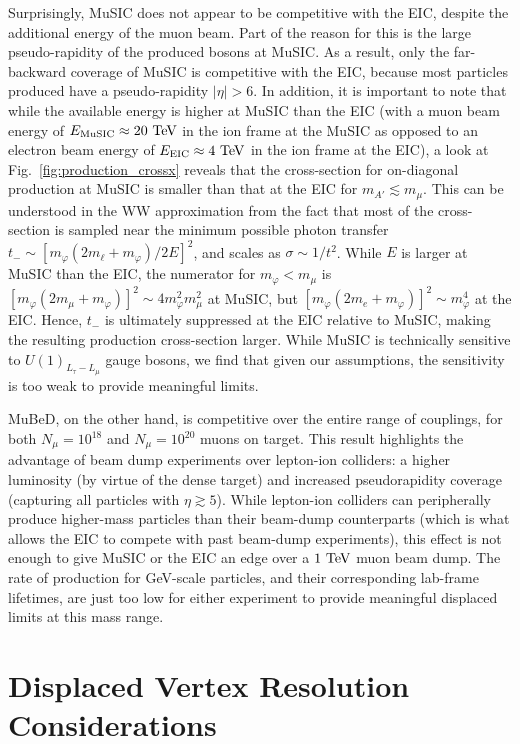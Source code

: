 Surprisingly, MuSIC does not appear to be competitive with the EIC, despite the additional energy of the muon beam. Part of the reason for this is the large pseudo-rapidity of the produced bosons at MuSIC. As a result, only the far-backward coverage of MuSIC is competitive with the EIC, because most particles produced have a pseudo-rapidity $|\eta| > 6$. In addition, it is important to note that while the available energy is higher at MuSIC than the EIC (with a muon beam energy of $E_{\rm MuSIC} \approx 20~{\rm TeV}$ in the ion frame at the MuSIC as opposed to an electron beam energy of $E_{\rm EIC} \approx 4~{\rm TeV}$ in the ion frame at the EIC), a look at Fig.~\ref{fig:production_crossx} reveals that the cross-section for on-diagonal production at MuSIC is smaller than that at the EIC for $m_{A'} \lesssim m_\mu$. This can be understood in the WW approximation from the fact that most of the cross-section is sampled near the minimum possible photon transfer $t_{-} \sim [m_\varphi (2m_\ell + m_\varphi)/2E]^2$, and scales as $\sigma \sim 1/t^2$. While $E$ is larger at MuSIC than the EIC, the numerator for $m_\varphi < m_\mu$ is $[m_\varphi (2m_\mu + m_\varphi)]^2 \sim 4m_\varphi^2 m_\mu^2$ at MuSIC, but $[m_\varphi(2m_e + m_\varphi)]^2 \sim m_\varphi^4$ at the EIC. Hence, $t_-$ is ultimately suppressed at the EIC relative to MuSIC, making the resulting production cross-section larger. While MuSIC is technically sensitive to $U(1)_{L_\tau - L_\mu}$ gauge bosons, we find that given our assumptions, the sensitivity is too weak to provide meaningful limits.

 MuBeD, on the other hand, is competitive over the entire range of couplings, for both $N_\mu = 10^{18}$ and $N_\mu = 10^{20}$ muons on target. This result highlights the advantage of beam dump experiments over lepton-ion colliders: a higher luminosity (by virtue of the dense target) and increased pseudorapidity coverage (capturing all particles with $\eta \gtrsim 5$). While lepton-ion colliders can peripherally produce higher-mass particles than their beam-dump counterparts (which is what allows the EIC to compete with past beam-dump experiments), this effect is not enough to give MuSIC or the EIC an edge over a $1~{\rm TeV}$ muon beam dump. The rate of production for GeV-scale particles, and their corresponding lab-frame lifetimes, are just too low for either experiment to provide meaningful displaced limits at this mass range. 

\section{Displaced Vertex Resolution Considerations}\label{sec:displaced_vertex_resolution}

